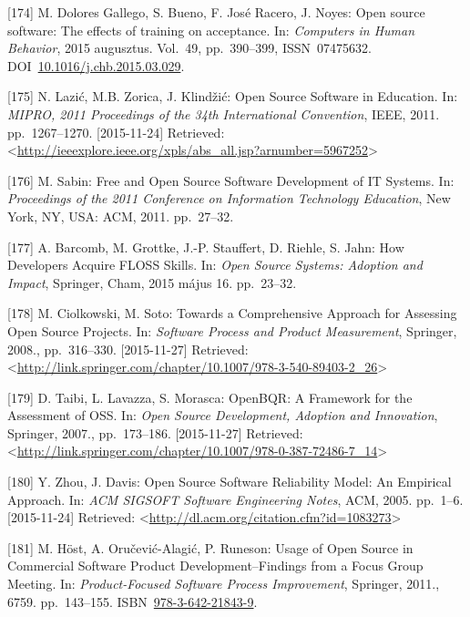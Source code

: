 \documentclass[12pt,magyar,a4paper,oneside]{scrreprt}
\begin{document}
\leavevmode\hypertarget{ref-dolores_gallego_open_2015}{}%
{[}174{]} M. Dolores Gallego, S. Bueno, F. José Racero, J. Noyes: Open
source software: The effects of training on acceptance. In:
\emph{Computers in Human Behavior}, 2015 augusztus. Vol.~49,
pp.~390--399, ISSN~07475632.
DOI~\href{https://doi.org/10.1016/j.chb.2015.03.029}{10.1016/j.chb.2015.03.029}.

\leavevmode\hypertarget{ref-lazic_open_2011}{}%
{[}175{]} N. Lazić, M.B. Zorica, J. Klindžić: Open Source Software in
Education. In: \emph{MIPRO, 2011 Proceedings of the 34th International
Convention}, IEEE, 2011. pp.~1267--1270. {[}2015-11-24{]} Retrieved:
\textless{}\url{http://ieeexplore.ieee.org/xpls/abs_all.jsp?arnumber=5967252}\textgreater{}

\leavevmode\hypertarget{ref-sabin_free_2011}{}%
{[}176{]} M. Sabin: Free and Open Source Software Development of IT
Systems. In: \emph{Proceedings of the 2011 Conference on Information
Technology Education}, New York, NY, USA: ACM, 2011. pp.~27--32.

\leavevmode\hypertarget{ref-barcomb_how_2015}{}%
{[}177{]} A. Barcomb, M. Grottke, J.-P. Stauffert, D. Riehle, S. Jahn:
How Developers Acquire FLOSS Skills. In: \emph{Open Source Systems:
Adoption and Impact}, Springer, Cham, 2015 május 16. pp.~23--32.

\leavevmode\hypertarget{ref-ciolkowski_towards_2008}{}%
{[}178{]} M. Ciolkowski, M. Soto: Towards a Comprehensive Approach for
Assessing Open Source Projects. In: \emph{Software Process and Product
Measurement}, Springer, 2008., pp.~316--330. {[}2015-11-27{]} Retrieved:
\textless{}\url{http://link.springer.com/chapter/10.1007/978-3-540-89403-2_26}\textgreater{}

\leavevmode\hypertarget{ref-taibi_openbqr_2007}{}%
{[}179{]} D. Taibi, L. Lavazza, S. Morasca: OpenBQR: A Framework for the
Assessment of OSS. In: \emph{Open Source Development, Adoption and
Innovation}, Springer, 2007., pp.~173--186. {[}2015-11-27{]} Retrieved:
\textless{}\url{http://link.springer.com/chapter/10.1007/978-0-387-72486-7_14}\textgreater{}

\leavevmode\hypertarget{ref-zhou_open_2005}{}%
{[}180{]} Y. Zhou, J. Davis: Open Source Software Reliability Model: An
Empirical Approach. In: \emph{ACM SIGSOFT Software Engineering Notes},
ACM, 2005. pp.~1--6. {[}2015-11-24{]} Retrieved:
\textless{}\url{http://dl.acm.org/citation.cfm?id=1083273}\textgreater{}

\leavevmode\hypertarget{ref-host_usage_2011}{}%
{[}181{]} M. Höst, A. Oručević-Alagić, P. Runeson: Usage of Open Source
in Commercial Software Product Development--Findings from a Focus Group
Meeting. In: \emph{Product-Focused Software Process Improvement},
Springer, 2011., 6759. pp.~143--155.
ISBN~\href{https://worldcat.org/isbn/978-3-642-21843-9}{978-3-642-21843-9}.
\end{document}
